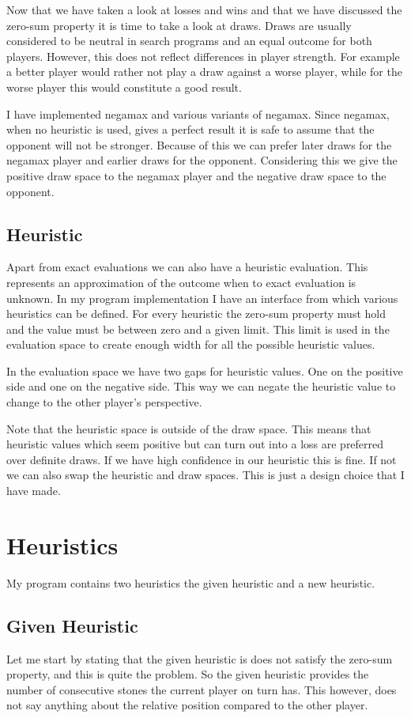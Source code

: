\documentclass[a4paper]{article}
\begin{document}
\noindent
Now that we have taken a look at losses and wins and that we have discussed the
zero-sum property it is time to take a look at draws. Draws are usually
considered to be neutral in search programs and an equal outcome for both
players. However, this does not reflect differences in player strength. For
example a better player would rather not play a draw against a worse player,
while for the worse player this would constitute a good result.

I have implemented negamax and various variants of negamax. Since negamax, when
no heuristic is used, gives a perfect result it is safe to assume that the
opponent will not be stronger. Because of this we can prefer later draws for
the negamax player and earlier draws for the opponent. Considering this we give
the positive draw space to the negamax player and the negative draw space to
the opponent.

\subsection{Heuristic}
Apart from exact evaluations we can also have a heuristic evaluation. This
represents an approximation of the outcome when to exact evaluation is unknown.
In my program implementation I have an interface from which various heuristics
can be defined. For every heuristic the zero-sum property must hold and the
value must be between zero and a given limit. This limit is used in the
evaluation space to create enough width for all the possible heuristic values.

In the evaluation space we have two gaps for heuristic values. One on the
positive side and one on the negative side. This way we can negate the
heuristic value to change to the other player's perspective.

Note that the heuristic space is outside of the draw space. This means that
heuristic values which seem positive but can turn out into a loss are preferred
over definite draws. If we have high confidence in our heuristic this is fine.
If not we can also swap the heuristic and draw spaces. This is just a design
choice that I have made.

\section{Heuristics}
My program contains two heuristics the given heuristic and a new heuristic.

\subsection{Given Heuristic}
Let me start by stating that the given heuristic is does not satisfy the
zero-sum property, and this is quite the problem. So the given heuristic
provides the number of consecutive stones the current player on turn has. This
however, does not say anything about the relative position compared to the
other player.
\end{document}
